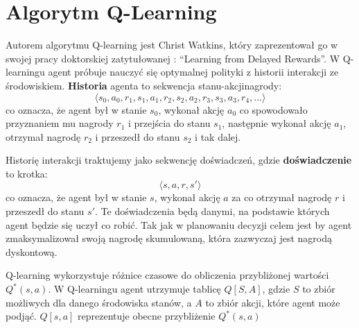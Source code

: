 \documentclass[a4paper, 12pt,oneside]{book}
\begin{document}
\chapter{Algorytm Q-Learning}
\label{chapter:qlearning}
Autorem algorytmu Q-learning jest Christ Watkins, który zaprezentował go w
swojej pracy doktorskiej zatytułowanej : ``Learning from Delayed
Rewards''\cite{qlearning_inventor}.
W Q-learningu agent próbuje nauczyć się optymalnej polityki z historii
interakcji ze środowiskiem. \textbf{Historia} agenta to sekwencja
stanu-akcji\dywiz nagrody:
\[\langle s_0, a_0, r_1, s_1, a_1, r_2, s_2, a_2, r_3, s_3, a_3, r_4, \dots
\rangle\]
co oznacza, że agent był w stanie $s_0$, wykonał akcję $a_0$ co spowodowało
przyznaniem mu nagrody $r_1$ i przejścia do stanu $s_1$, następnie wykonał
akcję $a_1$, otrzymał nagrodę $r_2$ i przeszedł do stanu $s_2$ i tak dalej.

Historię interakcji traktujemy jako sekwencję doświadczeń, gdzie
\textbf{doświadczenie} to krotka:
\[\langle s, a, r, s' \rangle\]
co oznacza, że agent był w stanie $s$, wykonał akcję $a$ za co otrzymał nagrodę
$r$ i przeszedł do stanu $s'$. Te doświadczenia będą danymi, na podstawie
których agent będzie się uczył co robić. Tak jak w planowaniu decyzji celem
jest by agent zmaksymalizował swoją nagrodę skumulowaną, która zazwyczaj jest
nagrodą dyskontową.

Q-learning wykorzystuje różnice czasowe do obliczenia przybliżonej wartości
$Q^*(s, a)$. W Q-learningu agent utrzymuje tablicę $Q[S,A]$, gdzie $S$ to zbiór
możliwych dla danego środowiska stanów, a $A$ to zbiór akcji, które agent może
podjąć. $Q[s,a]$ reprezentuje obecne przybliżenie $Q^*(s,a)$
\end{document}
